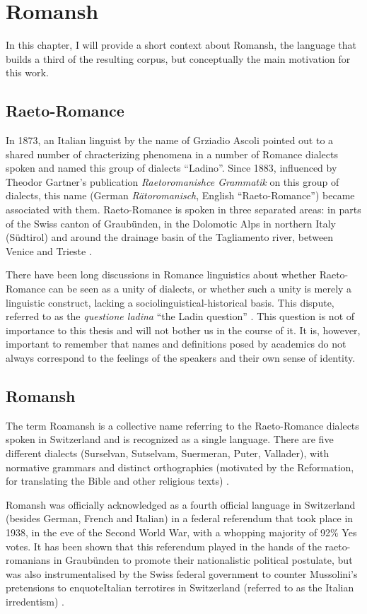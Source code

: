 \chapter{Romansh}

In this chapter, I will provide a short context about Romansh, the language that builds a third of the resulting corpus, but conceptually the main motivation for this work.

\section{Raeto-Romance}
In 1873, an Italian linguist by the name of Grziadio Ascoli pointed out to a shared number of chracterizing phenomena in a number of Romance dialects spoken and named this group of dialects \enquote{Ladino}. 
Since 1883, influenced by Theodor Gartner's publication \emph{Raetoromanishce Grammatik} on this group of dialects, this name (German \emph{Rätoromanisch}, English \enquote{Raeto-Romance}) became associated with them. 
Raeto-Romance is spoken in three separated areas: in parts of the Swiss canton of Graubünden, in the Dolomotic Alps in northern Italy (Südtirol) and around the drainage basin of the Tagliamento river, between Venice and Trieste \autocite[1]{haiman1992}.

There have been long discussions in Romance linguistics about whether Raeto-Romance can be seen as a unity of dialects, or whether such a unity is merely a linguistic construct, lacking a sociolinguistical-historical basis. 
This dispute, referred to as the \emph{questione ladina} \enquote{the Ladin question} \autocite{liver1999}. 
This question is not of importance to this thesis and will not bother us in the course of it. 
It is, however, important to remember that names and definitions posed by academics do not always correspond to the feelings of the speakers and their own sense of identity.

\section{Romansh}
The term Roamansh is a collective name referring to the Raeto-Romance dialects spoken in Switzerland and is recognized as a single language. 
There are five different dialects (Surselvan, Sutselvam, Suermeran, Puter, Vallader), with normative grammars and distinct orthographies (motivated by the Reformation, for translating the Bible and other religious texts) \autocite[1]{haiman1992}.

Romansh was officially acknowledged as a fourth official language in Switzerland (besides German, French and Italian) in a federal referendum that took place in 1938, in the eve of the Second World War, with a whopping majority of 92\% Yes votes. 
It has been shown that this referendum played in the hands of the raeto-romanians in Graubünden to promote their nationalistic political postulate, but was also instrumentalised by the Swiss federal government to counter Mussolini's pretensions to enquote{Italian} terrotires in Switzerland (referred to as the Italian irredentism) \autocite{valaer2012}.

